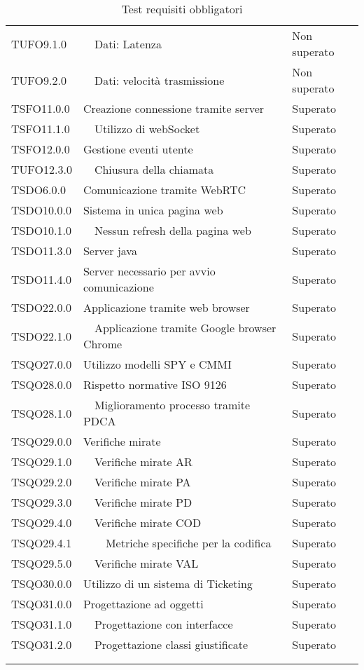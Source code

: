 \begin{longtable}{lp{}l}
TUFO9.1.0&	\ \ Dati: Latenza		&Non superato\\
TUFO9.2.0&	\ \ Dati: velocità trasmissione	&Non superato\\
TSFO11.0.0&	Creazione connessione tramite server	&Superato\\
TSFO11.1.0&	\ \ Utilizzo di webSocket &Superato\\
TSFO12.0.0&	Gestione eventi utente	&Superato\\
TUFO12.3.0&	\ \ Chiusura della chiamata &Superato\\
TSDO6.0.0&	Comunicazione tramite WebRTC	&Superato\\
TSDO10.0.0&	Sistema in unica pagina web	 	&Superato\\
TSDO10.1.0&	\ \ Nessun refresh della pagina web 	&Superato\\
TSDO11.3.0&	Server java		&Superato\\
TSDO11.4.0&	Server necessario per avvio comunicazione	&Superato\\
TSDO22.0.0&	Applicazione tramite web browser		&Superato\\
TSDO22.1.0&	\ \ Applicazione tramite Google browser Chrome	&Superato\\
TSQO27.0.0&	Utilizzo modelli SPY e CMMI	&Superato\\
TSQO28.0.0&	Rispetto normative ISO 9126		&Superato\\
TSQO28.1.0&	\ \ Miglioramento processo tramite PDCA			&Superato\\
TSQO29.0.0&	Verifiche mirate 	&Superato\\
TSQO29.1.0&	\ \ Verifiche mirate AR	&Superato\\
TSQO29.2.0&	\ \ Verifiche mirate PA	&Superato\\
TSQO29.3.0&	\ \ Verifiche mirate PD	&Superato\\
TSQO29.4.0&	\ \ Verifiche mirate COD	&Superato\\
TSQO29.4.1&	\ \ \ \ Metriche specifiche per la codifica	&Superato\\
TSQO29.5.0&	\ \ Verifiche mirate VAL	&Superato\\
TSQO30.0.0&	Utilizzo di un sistema di Ticketing		&Superato\\
TSQO31.0.0&	Progettazione ad oggetti		&Superato\\
TSQO31.1.0&	\ \ Progettazione con interfacce	&Superato\\
TSQO31.2.0&	\ \ Progettazione classi giustificate	&Superato\\

\bottomrule\rowcolor{white}\\
\rowcolor{white}\caption{Test requisiti obbligatori} \label{tab:testObbligatori}
\end{longtable}


